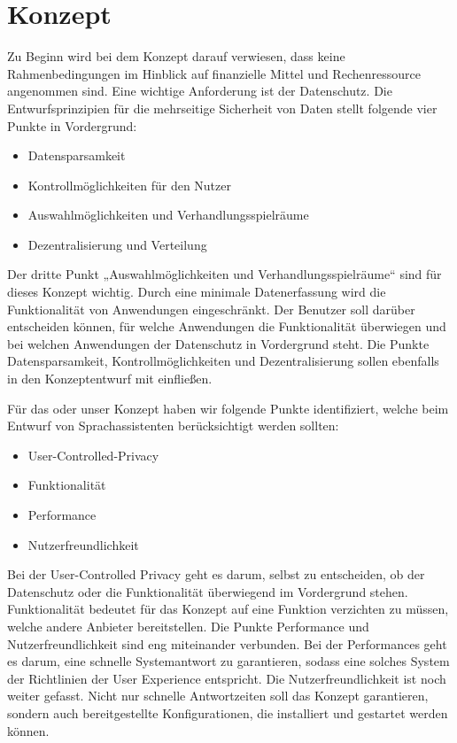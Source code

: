 \section{Konzept}\label{sec:konzept}

Zu Beginn wird bei dem Konzept darauf verwiesen, dass keine Rahmenbedingungen im Hinblick auf finanzielle Mittel und Rechenressource angenommen sind.
Eine wichtige Anforderung ist der Datenschutz. Die Entwurfsprinzipien für die mehrseitige Sicherheit von Daten stellt folgende vier Punkte in Vordergrund\cite{kairannenberg}:

\begin{itemize}
\item Datensparsamkeit
\item Kontrollmöglichkeiten für den Nutzer 
\item Auswahlmöglichkeiten und Verhandlungsspielräume 
\item Dezentralisierung und Verteilung

\end{itemize}
Der dritte Punkt „Auswahlmöglichkeiten und Verhandlungsspielräume“ sind für dieses Konzept wichtig. Durch eine minimale Datenerfassung wird die Funktionalität von Anwendungen eingeschränkt. Der Benutzer soll darüber entscheiden können, für welche Anwendungen die Funktionalität überwiegen und bei welchen Anwendungen der Datenschutz in Vordergrund steht. Die Punkte Datensparsamkeit, Kontrollmöglichkeiten und Dezentralisierung sollen ebenfalls in den Konzeptentwurf mit einfließen.

Für das oder unser Konzept haben wir folgende Punkte identifiziert, welche beim Entwurf von Sprachassistenten berücksichtigt werden sollten:

\begin{itemize}
\item User-Controlled-Privacy
\item Funktionalität
\item Performance
\item Nutzerfreundlichkeit	
\end{itemize}

Bei der User-Controlled Privacy geht es darum, selbst zu entscheiden, ob der Datenschutz oder die Funktionalität überwiegend im Vordergrund stehen. Funktionalität bedeutet für das Konzept auf eine Funktion verzichten zu müssen, welche andere Anbieter bereitstellen. Die Punkte Performance und Nutzerfreundlichkeit sind eng miteinander verbunden. Bei der Performances geht es darum, eine schnelle Systemantwort zu garantieren, sodass eine solches System der Richtlinien der User Experience entspricht. Die Nutzerfreundlichkeit ist noch weiter gefasst. Nicht nur schnelle Antwortzeiten soll das Konzept garantieren, sondern auch bereitgestellte Konfigurationen, die installiert und gestartet werden können. 

